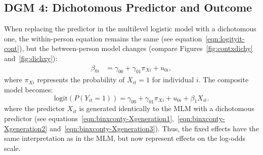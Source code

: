 \documentclass[stu]{apa7}
\begin{document}



\subsection{DGM 4: Dichotomous Predictor and Outcome}

When replacing the predictor in the multilevel logistic model with a dichotomous one, the within-person equation remains the same (see equation~\ref{eqn:logityit-cont}), but the between-person model changes (compare Figures~\ref{fig:contxdichy} and~\ref{fig:dichxy}):
\begin{align}
\label{eqn:beta0-dich}
\beta_{0i} &= \gamma_{00} + \gamma_{01} \pi_{Xi} + u_{0i},
\end{align}
where \( \pi_{Xi} \) represents the probability of \( X_{it} = 1 \) for individual \( i \). The composite model becomes:
\begin{equation}
\text{logit}(P(Y_{it} = 1)) = \gamma_{00} + \gamma_{01} \pi_{Xi} + u_{0i} + \beta_1 X_{it}.
\end{equation}
where the predictor \( X_{it} \) is generated identically to the MLM with a dichotomous predictor (see equations~\ref{eqn:binxconty-Xgeneration1},~\ref{eqn:binxconty-Xgeneration2} and~\ref{eqn:binxconty-Xgeneration3}).  Thus, the fixed effects have the same interpretation as in the MLM, but now represent effects on the log-odds scale.
\end{document}
